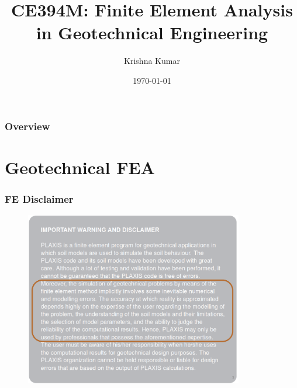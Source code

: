 \documentclass[notes]{beamer}
\title[CE394M: FEM Geo]{CE394M: Finite Element Analysis in Geotechnical Engineering}
\author{Krishna Kumar} %
\institute[UT Austin] %
{
University of Texas at Austin \\
\medskip
\textit{
  \url{krishnak@utexas.edu}} %
}
\date{\today} %
\begin{document}
\begin{frame}
\titlepage %
\end{frame}

\begin{frame}
 \frametitle{Overview}
 \tableofcontents
\end{frame}

\section{Geotechnical FEA}
\begin{frame}
\frametitle{FE Disclaimer}
\begin{figure}[ht]
	\centering
	\includegraphics[width=0.85\textwidth]{figs/plaxis-disclaimer.png}
\end{figure}
\end{frame}
\end{document}

